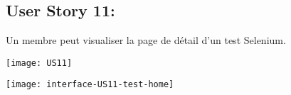 \newpage{}
\subsection{User Story 11:}
Un membre peut visualiser la page de détail d'un test Selenium.

  \begin{center}
        \texttt{[image: US11]}
  \end{center}

  \newpage{}
  \begin{center}
        \texttt{[image: interface-US11-test-home]}
  \end{center}